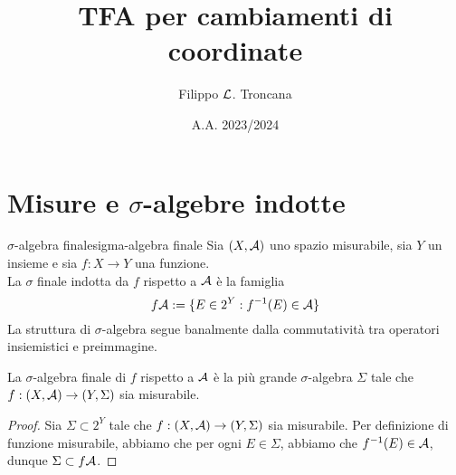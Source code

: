 \documentclass{article}
\title{TFA per cambiamenti di coordinate}
\author{Filippo $\mathcal{L}$. Troncana}
\date{A.A. 2023/2024}
\begin{document}
\maketitle

\section{Misure e $\sigma$-algebre indotte}

\begin{definition}{$\sigma$-algebra finale}{sigma-algebra finale}
    Sia $(X,\mathcal{A})$ uno spazio misurabile, sia $Y$ un insieme e sia $f:X\to Y$ una funzione.\\
    La $\sigma$ finale indotta da $f$ rispetto a $\mathcal{A}$ è la famiglia
    \[f\mathcal{A} := \{E \in 2^Y : f^{-1}(E) \in \mathcal{A}\}\]
    La struttura di $\sigma$-algebra segue banalmente dalla commutatività tra operatori insiemistici e preimmagine.
\end{definition}
\begin{remark}{}{}
    La $\sigma$-algebra finale di $f$ rispetto a $\mathcal{A}$ è la più grande $\sigma$-algebra $\Sigma$ tale che $f : (X,\mathcal{A})\to (Y,\Sigma)$ sia misurabile.
    \begin{proof}
        Sia $\Sigma \subset 2^Y$ tale che $f : (X,\mathcal{A})\to (Y,\Sigma)$ sia misurabile. Per definizione di funzione misurabile, abbiamo che per ogni $E \in \Sigma$, abbiamo che $f^{-1}(E)\in \mathcal{A}$, dunque $\Sigma\subset f\mathcal{A}$.
    \end{proof}
\end{remark}
\end{document}
